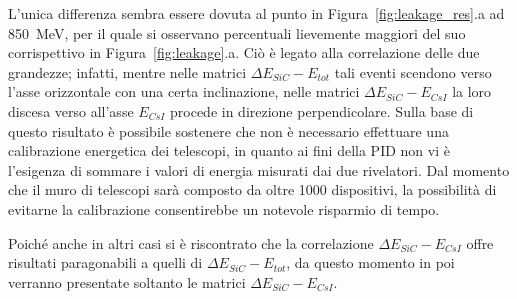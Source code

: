 L'unica differenza sembra essere dovuta al punto in Figura~\ref{fig:leakage_res}.a ad 850~MeV, per il quale si osservano percentuali lievemente maggiori del suo corrispettivo in Figura~\ref{fig:leakage}.a. 
Ciò è legato alla correlazione delle due grandezze;
infatti, mentre nelle matrici $\Delta E_{SiC} - E_{tot}$ tali eventi scendono verso l'asse orizzontale con una certa inclinazione, nelle matrici $\Delta E_{SiC} - E_{CsI}$ la loro discesa verso all'asse $E_{CsI}$ procede in direzione perpendicolare. 
Sulla base di questo risultato è possibile sostenere che non è necessario effettuare una calibrazione energetica dei telescopi, in quanto ai fini della PID non vi è l'esigenza di sommare i valori di energia misurati dai due rivelatori.
Dal momento che il muro di telescopi sarà composto da oltre 1000 dispositivi, la possibilità di evitarne la calibrazione consentirebbe un notevole risparmio di tempo.











Poiché anche in altri casi si è riscontrato che la correlazione $\Delta E_{SiC} - E_{CsI}$ offre risultati paragonabili a quelli di $\Delta E_{SiC} - E_{tot}$, da questo momento in poi verranno presentate soltanto le matrici $\Delta E_{SiC} - E_{CsI}$.










\subsection{} \label{par:interazioni_adroniche}






